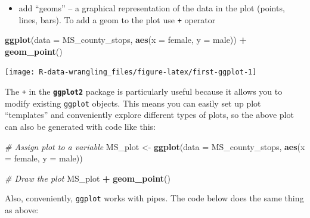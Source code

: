 \documentclass[]{book}
\newenvironment{Shaded}{\begin{snugshade}}{\end{snugshade}}
\newcommand{\CommentTok}[1]{\textcolor[rgb]{0.56,0.35,0.01}{\textit{#1}}}
\newcommand{\DataTypeTok}[1]{\textcolor[rgb]{0.13,0.29,0.53}{#1}}
\newcommand{\KeywordTok}[1]{\textcolor[rgb]{0.13,0.29,0.53}{\textbf{#1}}}
\newcommand{\NormalTok}[1]{#1}
\newcommand{\OperatorTok}[1]{\textcolor[rgb]{0.81,0.36,0.00}{\textbf{#1}}}
\newcommand{\StringTok}[1]{\textcolor[rgb]{0.31,0.60,0.02}{#1}}
\providecommand{\tightlist}{%
  \setlength{\itemsep}{0pt}\setlength{\parskip}{0pt}}
\begin{document}
\begin{itemize}
\tightlist
\item
  add ``geoms'' -- a graphical representation of the data in the plot (points, lines, bars). To add a geom to the plot use \texttt{+} operator
\end{itemize}

\begin{Shaded}
\begin{Highlighting}[]
\KeywordTok{ggplot}\NormalTok{(}\DataTypeTok{data =}\NormalTok{ MS_county_stops, }\KeywordTok{aes}\NormalTok{(}\DataTypeTok{x =}\NormalTok{ female, }\DataTypeTok{y =}\NormalTok{ male)) }\OperatorTok{+}
\StringTok{  }\KeywordTok{geom_point}\NormalTok{()}
\end{Highlighting}
\end{Shaded}

\texttt{[image: R-data-wrangling\_files/figure-latex/first-ggplot-1]}

The \texttt{+} in the \textbf{\texttt{ggplot2}} package is particularly useful because it allows you
to modify existing \texttt{ggplot} objects. This means you can easily set up plot
``templates'' and conveniently explore different types of plots, so the above
plot can also be generated with code like this:

\begin{Shaded}
\begin{Highlighting}[]
\CommentTok{# Assign plot to a variable}
\NormalTok{MS_plot <-}\StringTok{ }\KeywordTok{ggplot}\NormalTok{(}\DataTypeTok{data =}\NormalTok{ MS_county_stops, }\KeywordTok{aes}\NormalTok{(}\DataTypeTok{x =}\NormalTok{ female, }\DataTypeTok{y =}\NormalTok{ male))}

\CommentTok{# Draw the plot}
\NormalTok{MS_plot }\OperatorTok{+}\StringTok{ }\KeywordTok{geom_point}\NormalTok{()}
\end{Highlighting}
\end{Shaded}

Also, conveniently, \texttt{ggplot} works with pipes. The code below does the same thing as above:

\begin{Shaded}
\end{Shaded}
\end{document}
